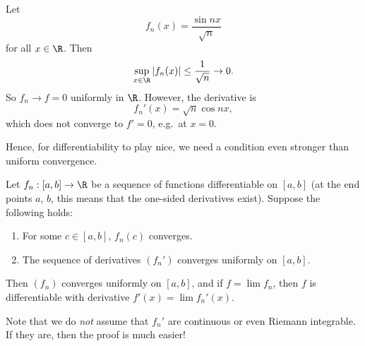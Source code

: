 \documentclass[a4paper]{article}
\begin{document}
\begin{eg}
  Let
  \[
    f_n(x) = \frac{\sin nx}{\sqrt{n}}
  \]
  for all $x\in \R$. Then
  \[
    \sup_{x\in \R}|f_n (x)| \leq \frac{1}{\sqrt{n}} \to 0.
  \]
  So $f_n \to f = 0$ uniformly in $\R$. However, the derivative is
  \[
    f_n'(x) = \sqrt{n} \cos nx,
  \]
  which does not converge to $f' = 0$, e.g.\ at $x = 0$.
\end{eg}

Hence, for differentiability to play nice, we need a condition even stronger than uniform convergence.
\begin{thm}
  Let $f_n: [a, b]\to \R$ be a sequence of functions differentiable on $[a, b]$ (at the end points $a$, $b$, this means that the one-sided derivatives exist). Suppose the following holds:
  \begin{enumerate}
    \item For some $c\in [a, b]$, $f_n(c)$ converges.
    \item The sequence of derivatives $(f_n')$ converges uniformly on $[a, b]$.
  \end{enumerate}
  Then $(f_n)$ converges uniformly on $[a, b]$, and if $f = \lim f_n$, then $f$ is differentiable with derivative $f'(x) = \lim f_n'(x)$.
\end{thm}
Note that we do \emph{not} assume that $f_n'$ are continuous or even Riemann integrable. If they are, then the proof is much easier!
\end{document}
